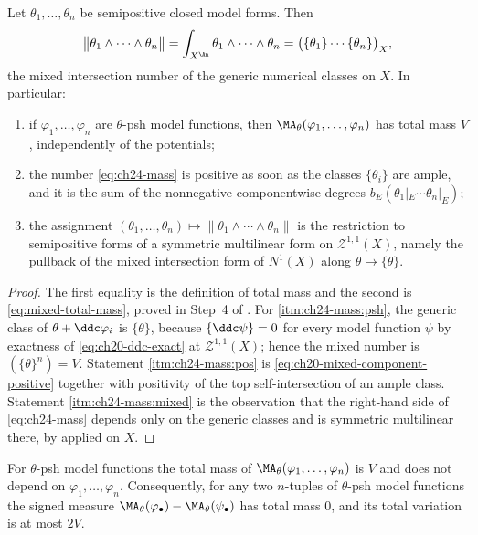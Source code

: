 \begin{theorem}
\label{thm:ch24-mass}
Let \(\theta_1,\ldots,\theta_n\) be semipositive closed model forms.  Then
\begin{equation}
\label{eq:ch24-mass}
 \bigl\|\theta_1\wedge\cdots\wedge\theta_n\bigr\|
 =\int_{X^{\An}}\theta_1\wedge\cdots\wedge\theta_n
 =\bigl(\{\theta_1\}\cdots\{\theta_n\}\bigr)_X ,
\end{equation}
the mixed intersection number of the generic numerical classes on \(X\).  In
particular:
\begin{enumerate}
\item\label{itm:ch24-mass:psh} if \(\varphi_1,\ldots,\varphi_n\) are
 \(\theta\)-psh model functions, then
 \(\MA_\theta(\varphi_1,\ldots,\varphi_n)\) has total mass \(V\),
 independently of the potentials;
\item\label{itm:ch24-mass:pos} the number \eqref{eq:ch24-mass} is positive
 as soon as the classes \(\{\theta_i\}\) are ample, and it is the sum of the
 nonnegative componentwise degrees \(b_E(\theta_1|_E\cdots\theta_n|_E)\);
\item\label{itm:ch24-mass:mixed} the assignment
 \((\theta_1,\ldots,\theta_n)\mapsto\|\theta_1\wedge\cdots\wedge\theta_n\|\)
 is the restriction to semipositive forms of a symmetric multilinear form on
 \(\mathcal Z^{1,1}(X)\), namely the pullback of the mixed intersection form
 of \(N^1(X)\) along \(\theta\mapsto\{\theta\}\).
\end{enumerate}
\end{theorem}

\begin{proof}
The first equality is the definition of total mass and the second is
\eqref{eq:mixed-total-mass}, proved in Step~4 of
.  For \cref{itm:ch24-mass:psh}, the generic class
of \(\theta+\ddc\varphi_i\) is \(\{\theta\}\), because
\(\{\ddc\psi\}=0\) for every model function \(\psi\) by exactness of
\eqref{eq:ch20-ddc-exact} at \(\mathcal Z^{1,1}(X)\); hence the mixed number
is \((\{\theta\}^n)=V\).  Statement \cref{itm:ch24-mass:pos} is
\eqref{eq:ch20-mixed-component-positive} together with positivity of the top
self-intersection of an ample class.  Statement \cref{itm:ch24-mass:mixed} is
the observation that the right-hand side of \eqref{eq:ch24-mass} depends only
on the generic classes and is symmetric multilinear there, by
 applied on \(X\).
\end{proof}

\begin{corollary}
\label{cor:ch24-mass-independent}
For \(\theta\)-psh model functions the total mass of
\(\MA_\theta(\varphi_1,\ldots,\varphi_n)\) is \(V\) and does not depend on
\(\varphi_1,\ldots,\varphi_n\).  Consequently, for any two \(n\)-tuples of
\(\theta\)-psh model functions the signed measure
\(\MA_\theta(\varphi_\bullet)-\MA_\theta(\psi_\bullet)\) has total mass
\(0\), and its total variation is at most \(2V\).
\end{corollary}

